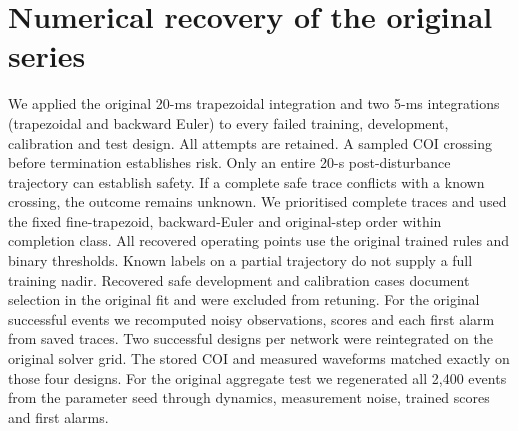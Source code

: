 \documentclass[10pt]{article}
\begin{document}
\section{Numerical recovery of the original series}
We applied the original 20-ms trapezoidal integration and two 5-ms integrations (trapezoidal and backward Euler) to every failed training, development, calibration and test design. All attempts are retained. A sampled COI crossing before termination establishes risk. Only an entire 20-s post-disturbance trajectory can establish safety. If a complete safe trace conflicts with a known crossing, the outcome remains unknown. We prioritised complete traces and used the fixed fine-trapezoid, backward-Euler and original-step order within completion class. All recovered operating points use the original trained rules and binary thresholds. Known labels on a partial trajectory do not supply a full training nadir. Recovered safe development and calibration cases document selection in the original fit and were excluded from retuning. For the original successful events we recomputed noisy observations, scores and each first alarm from saved traces. Two successful designs per network were reintegrated on the original solver grid. The stored COI and measured waveforms matched exactly on those four designs. For the original aggregate test we regenerated all 2,400 events from the parameter seed through dynamics, measurement noise, trained scores and first alarms.
\end{document}
